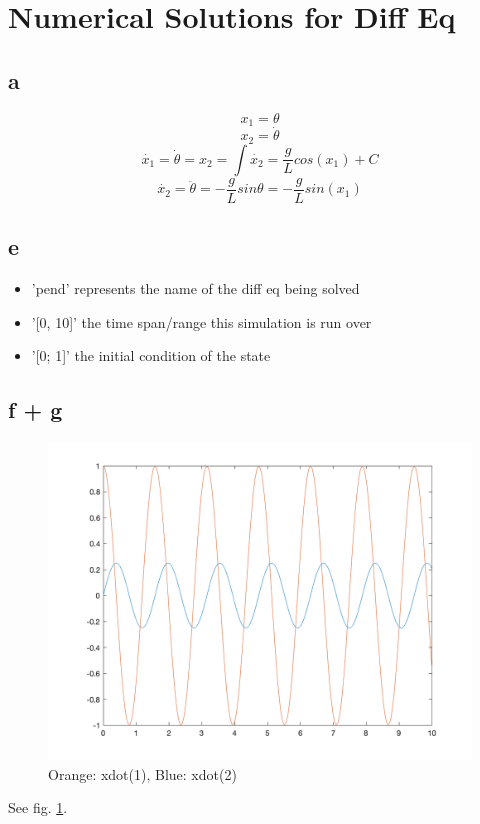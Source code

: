 \section{Numerical Solutions for Diff Eq}
\subsection{a}
$$
x_1 = \theta
$$
$$
x_2 = \dot{\theta}
$$
$$
\dot{x_1} = \dot{\theta} = x_2 = \int{\dot{x_2}} = \dfrac{g}{L}cos(x_1)  + C
$$
$$
\dot{x_2} = \ddot{\theta} = -\dfrac{g}{L}sin\theta =  -\dfrac{g}{L}sin(x_1)
$$

\subsection{e}

\begin{itemize}
\item 'pend' represents the name of the diff eq being solved
\item '[0, 10]' the time span/range this simulation is run over
\item '[0; 1]' the initial condition of the state 
\end{itemize}

\subsection{f + g}
\begin{figure}[htbp]
   \centering
   \includegraphics[width=\textwidth]{figs/pend.png}%
   \caption{Orange: xdot(1), Blue: xdot(2)}
   \label{fig:pend}
\end{figure}
See fig. \ref{fig:pend}.

